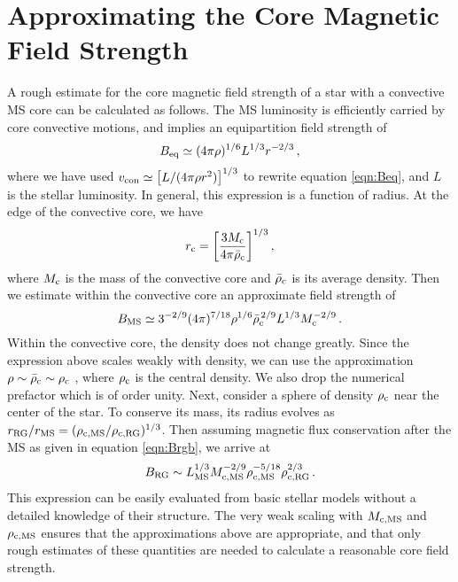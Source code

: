\section{Approximating the Core Magnetic Field Strength}
\label{Bcenap}

A rough estimate for the core magnetic field strength of a star with a convective MS core can be calculated as follows. The MS luminosity is efficiently carried by core convective motions, and implies an equipartition field strength of 
\begin{equation}
\label{eqn:Beq2}
B_{\rm eq} \simeq (4 \pi \rho)^{1/6} L^{1/3} r^{-2/3} \, ,
\end{equation}
where we have used $v_{\rm con} \simeq \big[L/(4 \pi \rho r^2)\big]^{1/3}$ to rewrite equation \ref{eqn:Beq}, and $L$ is the stellar luminosity. In general, this expression is a function of radius. At the edge of the convective core, we have
\begin{equation}
\label{eqn:rc}
r_{\rm c} = \bigg[ \frac{3 M_{\rm c}}{4 \pi {\bar \rho}_{\rm c}} \bigg]^{1/3} \, ,
\end{equation}
where $M_{\rm c}$ is the mass of the convective core and ${\bar \rho}_{\rm c}$ is its average density. Then we estimate within the convective core an approximate field strength of
\begin{equation}
\label{eqn:Beq3}
B_{\rm MS} \simeq 3^{-2/9} (4 \pi)^{7/18} \rho^{1/6} {\bar \rho}_{\rm c}^{\, 2/9} L^{1/3} M_{\rm c}^{-2/9} \, .
\end{equation}
Within the convective core, the density does not change greatly. Since the expression above scales weakly with density, we can use the approximation $\rho \sim {\bar \rho}_{\rm c} \sim \rho_{\rm c}$ , where $\rho_{\rm c}$ is the central density. We also drop the numerical prefactor which is of order unity. Next, consider a sphere of density $\rho_{\rm c}$ near the center of the star. To conserve its mass, its radius evolves as $r_{\rm RG}/r_{\rm MS} = (\rho_{\rm c,MS}/\rho_{\rm c,RG})^{1/3}$. Then assuming magnetic flux conservation after the MS as given in equation \ref{eqn:Brgb}, we arrive at 
\begin{equation}
\label{eqn:Bcen2}
B_{\rm RG} \sim L_{\rm MS}^{1/3} M_{\rm c,MS}^{-2/9} \rho_{\rm c,MS}^{-5/18} \rho_{\rm c,RG}^{2/3} \, .
\end{equation}
This expression can be easily evaluated from basic stellar models without a detailed knowledge of their structure. The very weak scaling with $M_{\rm c,MS}$ and $\rho_{\rm c,MS}$ ensures that the approximations above are appropriate, and that only rough estimates of these quantities are needed to calculate a reasonable core field strength.

